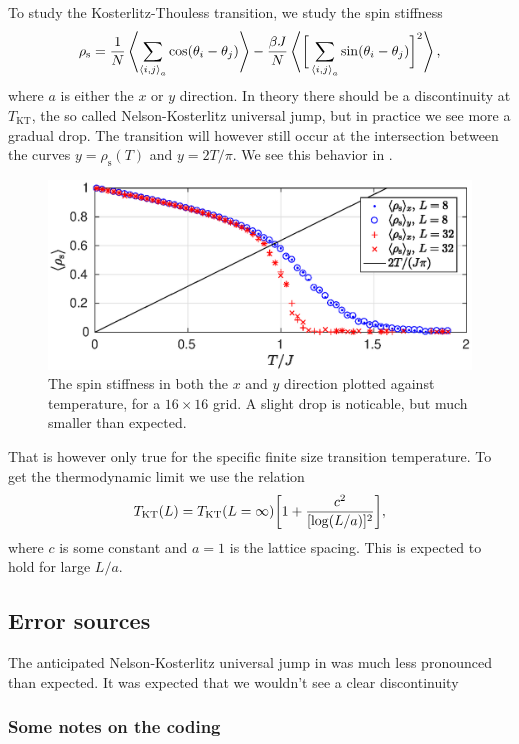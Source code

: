 \documentclass[11pt,letter, swedish, english
]{article}
\begin{document}
\newcommand{\rhos}{\rho_{\text{s}}}
\newcommand{\TKT}{T_{\text{KT}}}


To study the Kosterlitz-Thouless transition, we study the spin
stiffness
\begin{equation}
\rhos = \frac{1}{N}\ev{\sum_{\ev{i, j}_a}\cos(\theta_i - \theta_j)}
-\frac{\beta J}{N}
   \ev{\bigg[\sum_{\ev{i, j}_a}\sin(\theta_i - \theta_j)\bigg]^2},
\end{equation}
where $a$ is either the $x$ or $y$ direction. In theory there should
be a discontinuity at $\TKT$, the so called Nelson-Kosterlitz
universal jump, but in practice we see more a gradual drop. The
transition will however still occur at the intersection between the
curves $y=\rhos(T)$ and $y=2T/\pi$. We see this behavior in
. 

\begin{figure}
\centering
\includegraphics[width=1\textwidth]{XY_rhos_L-8-32_Nsteps-64.eps}
\caption{The spin stiffness in both the $x$ and $y$ direction plotted
  against temperature, for a $16\times16$ grid. A slight drop is
  noticable, but much smaller than expected. } 
\label{fig:rhos1}
\end{figure}

That is however only true for the specific finite size transition
temperature. To get the thermodynamic limit we use the relation
\cite{Melko-etal2004} 
\begin{equation}
\TKT(L) = \TKT(L=\infty)\qty[1+\frac{c^2}{[\log(L/a)]^2}],
\end{equation}
where $c$ is some constant and $a=1$ is the lattice spacing. This is
expected to hold for large $L/a$.




\subsection{Error sources}


The anticipated Nelson-Kosterlitz universal jump in 
was much less pronounced than expected. It was expected that we
wouldn't see a clear discontinuity


\subsubsection{Some notes on the coding}




\end{document}
